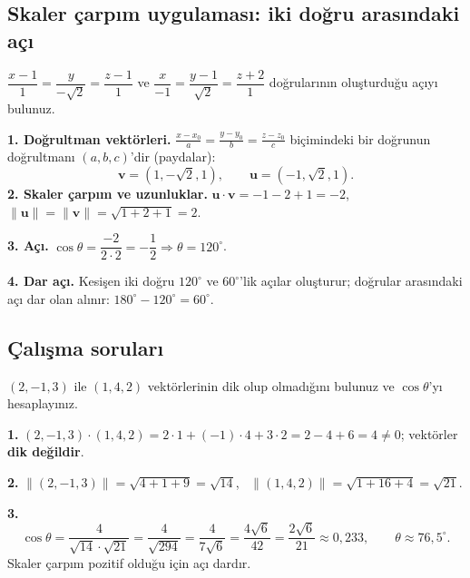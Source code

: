 \subsection{Skaler çarpım uygulaması: iki doğru arasındaki açı}

\begin{soru}
$\dfrac{x-1}{1}=\dfrac{y}{-\sqrt2}=\dfrac{z-1}{1}$ ve $\dfrac{x}{-1}=\dfrac{y-1}{\sqrt2}=\dfrac{z+2}{1}$ doğrularının oluşturduğu açıyı bulunuz.
\end{soru}
\begin{cevap}
\textbf{1. Doğrultman vektörleri.} $\frac{x-x_0}{a}=\frac{y-y_0}{b}=\frac{z-z_0}{c}$ biçimindeki bir doğrunun doğrultmanı $(a,b,c)$'dir (paydalar):
\[
\mathbf v=(1,-\sqrt2,1),\qquad \mathbf u=(-1,\sqrt2,1).
\]
\textbf{2. Skaler çarpım ve uzunluklar.}
$\mathbf u\cdot\mathbf v=-1-2+1=-2$, \ $\|\mathbf u\|=\|\mathbf v\|=\sqrt{1+2+1}=2$.

\textbf{3. Açı.} $\cos\theta=\dfrac{-2}{2\cdot2}=-\dfrac12\Rightarrow\theta=120^\circ$.

\textbf{4. Dar açı.} Kesişen iki doğru $120^\circ$ ve $60^\circ$'lik açılar oluşturur; doğrular arasındaki açı dar olan alınır: $180^\circ-120^\circ=\boxed{60^\circ}$.
\end{cevap}

\subsection{Çalışma soruları}

\begin{soru}
$(2,-1,3)$ ile $(1,4,2)$ vektörlerinin dik olup olmadığını bulunuz ve $\cos\theta$'yı hesaplayınız.
\end{soru}
\begin{cevap}
\textbf{1.} $(2,-1,3)\cdot(1,4,2)=2\cdot1+(-1)\cdot4+3\cdot2=2-4+6=4\neq0$; vektörler \textbf{dik değildir}.

\textbf{2.} $\|(2,-1,3)\|=\sqrt{4+1+9}=\sqrt{14}$, \ $\|(1,4,2)\|=\sqrt{1+16+4}=\sqrt{21}$.

\textbf{3.}
\[
\cos\theta=\frac{4}{\sqrt{14}\cdot\sqrt{21}}=\frac{4}{\sqrt{294}}=\frac{4}{7\sqrt6}=\frac{4\sqrt6}{42}=\frac{2\sqrt6}{21}\approx0{,}233,\qquad \theta\approx76{,}5^\circ .
\]
Skaler çarpım pozitif olduğu için açı dardır.
\end{cevap}

